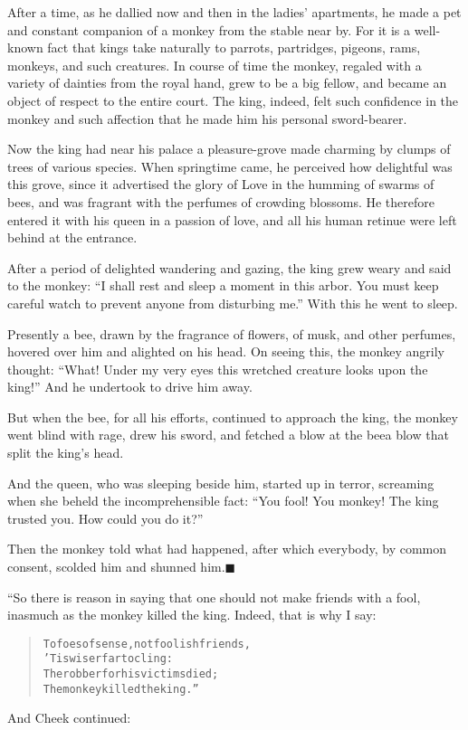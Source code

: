 \documentclass[article, twoside, 14pt]{memoir}
\newcommand{\qed}{\hfill \ensuremath{\blacksquare}}
\renewenvironment{verbatim}{%
\begin{quote}%
\vskip -10pt%
\begin{alltt}\normalfont\large}{\end{alltt}%
\end{quote}%
\vskip -10pt
} %
\begin{document}
After a time, as he dallied now and then in the ladies' apartments,
he made a pet and constant companion of a monkey from the stable
near by. For it is a well-known fact that kings take naturally to
parrots, partridges, pigeons, rams, monkeys, and such creatures. In
course of time the monkey, regaled with a variety of dainties from
the royal hand, grew to be a big fellow, and became an object of
respect to the entire court. The king, indeed, felt such confidence
in the monkey and such affection that he made him his personal
sword-bearer.

Now the king had near his palace a pleasure-grove made charming by
clumps of trees of various species. When springtime came, he
perceived how delightful was this grove, since it advertised the
glory of Love in the humming of swarms of bees, and was fragrant
with the perfumes of crowding blossoms. He therefore entered it
with his queen in a passion of love, and all his human retinue were
left behind at the entrance.

After a period of delighted wandering and gazing, the king grew
weary and said to the monkey:
``I shall rest and sleep a moment in this arbor. You must keep careful watch to prevent anyone from disturbing me.''
With this he went to sleep.

Presently a bee, drawn by the fragrance of flowers, of musk, and
other perfumes, hovered over him and alighted on his head. On
seeing this, the monkey angrily thought:
``What! Under my very eyes this wretched creature looks upon the king!''
And he undertook to drive him away.

But when the bee, for all his efforts, continued to approach the
king, the monkey went blind with rage, drew his sword, and fetched
a blow at the bee{\textemdash}a blow that split the king's head.

And the queen, who was sleeping beside him, started up in terror,
screaming when she beheld the incomprehensible fact:
``You fool! You monkey! The king trusted you. How could you do it?''

Then the monkey told what had happened, after which everybody, by
common consent, scolded him and shunned him.\hyperref[s34]{\qed}

“So there is reason in saying that one should not make friends with
a fool, inasmuch as the monkey killed the king. Indeed, that is why
I say:

\begin{verbatim}
To foes of sense, not foolish friends,
    'Tis wiser far to cling:
The robber for his victims died;
    The monkey killed the king.”
\end{verbatim}
And Cheek continued:
\end{document}
